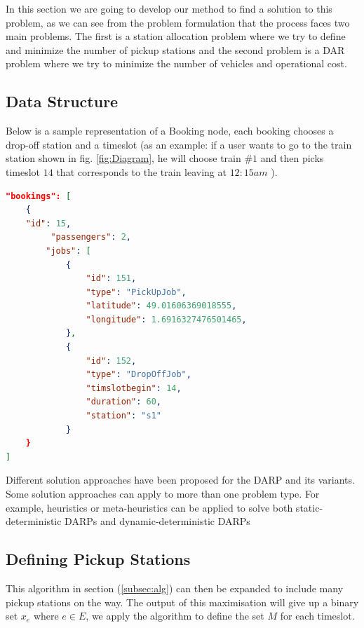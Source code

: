 \documentclass{article}
\begin{document}

In this section we are going to develop our method to find a solution to this problem, as we can see from the problem formulation that the process faces two main problems. The first is a station allocation problem where we try to define and minimize the number of pickup stations and the second problem is a DAR problem where we try to minimize the number of vehicles and operational cost.


\subsection{Data Structure}
\label{sec:data_struc}
Below is a sample representation of a Booking node, each booking chooses a drop-off station and a timeslot (as an example: if a user wants to go to the train station shown in fig. \ref{fig:Diagram}, he will choose train $\#1$ and then picks timeslot $14$ that corresponds to the train leaving at $12:15am$ ).
\begin{lstlisting}[language=json,firstnumber=1]
"bookings": [
    {
	"id": 15,
     	 "passengers": 2,
      	"jobs": [
        	{
          	    "id": 151,
          	    "type": "PickUpJob",
          	    "latitude": 49.01606369018555,
          	    "longitude": 1.6916327476501465,
        	},
        	{
          	    "id": 152,
          	    "type": "DropOffJob",
          	    "timslotbegin": 14,
          	    "duration": 60,
          	    "station": "s1"
        	}
    }
]
\end{lstlisting}


Different solution approaches have been proposed for the DARP and its variants. Some solution approaches can apply to more than one problem type. 
For example, heuristics or meta-heuristics can be applied to solve both static-deterministic DARPs and dynamic-deterministic DARPs

\subsection{Defining Pickup Stations}
\label{subsec:definepickup}


This algorithm in section (\ref{subsec:alg}) can then be expanded to include many pickup stations on the way. The output of this maximisation will give up a binary set $x_e$ where $e \in E$, we apply the algorithm to define the set $M$ for each timeslot.
\end{document}
